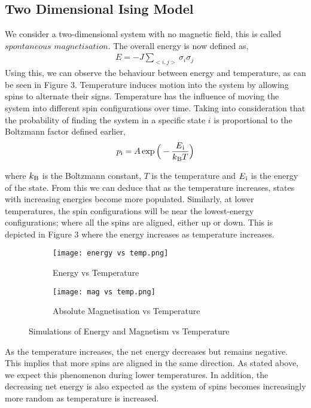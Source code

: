 \documentclass[a4paper]{article}
\begin{document}
\subsection{Two Dimensional Ising Model}

We consider a two-dimensional system with no magnetic field, this is called $spontaneous$ $magnetisation$. The overall energy is now defined as,
\begin{align}
E = -J\sum_{<i,j>} \sigma_{i}\sigma_{j} \
\end{align}
Using this, we can observe the behaviour between energy and temperature, as can be seen in Figure 3. Temperature induces motion into the system by allowing spins to alternate their signs. Temperature has the influence of moving the system into different spin configurations over time. Taking into consideration that the probability of finding the system in a specific state $i$ is proportional to the Boltzmann factor defined earlier, 
 \begin{align*} 
p\textsubscript{i} = A\exp \Big( - \frac{E\textsubscript{i}}{k\textsubscript{B} T}\Big)
\end{align*}

where ${k\textsubscript{B}}$ is the Boltzmann constant, $T$ is the temperature and $E\textsubscript{i}$ is the energy of the state. From this we can deduce that as the temperature increases, states with increasing energies become more populated. Similarly, at lower temperatures, the spin configurations will be near the lowest-energy configurations; where all the spins are aligned, either up or down. This is depicted in Figure 3 where the energy increases as temperature increases.   

\begin{figure}[h]
\centering
\begin{subfigure}{0.5\textwidth}
\texttt{[image: energy vs temp.png]} 
\caption{Energy vs Temperature}
\label{fig:subim1}
\end{subfigure}
\begin{subfigure}{0.425\textwidth}
\texttt{[image: mag vs temp.png]}
\caption{Absolute Magnetisation vs Temperature}
\label{fig:subim2}
\end{subfigure}
\caption{Simulations of Energy and Magnetism vs Temperature}
\label{fig:image2}
\end{figure}

As the temperature increases, the net energy decreases but remains negative. This implies that more spins are aligned in the same direction. As stated above, we expect this phenomenon during lower temperatures. In addition, the decreasing net energy is also expected as the system of spins becomes increasingly more random as temperature is increased.
\end{document}
